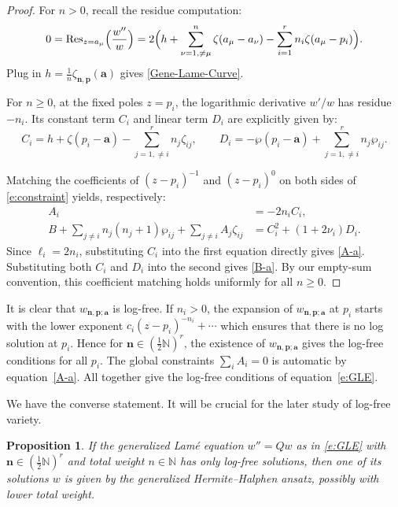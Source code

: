 \documentclass[11pt]{amsart}
\newtheorem{proposition}[theorem]{Proposition}
\theoremstyle{remark}
\numberwithin{equation}{section}
\begin{document}
\begin{proof}
For $n>0$, recall the residue computation:
\[
    0 = {\rm Res}_{z=a_\mu} \Big(\frac{w''}{w} \Big) = 2 \Big( h + \sum_{\nu = 1, \neq \mu}^n \zeta(a_\mu - a_\nu) - \sum_{i = 1}^{r} n_i \zeta(a_\mu - p_i) \Big).
\]
Plug in $h = \frac{1}{n}\zeta_{\mathbf{n},\mathbf{p}}(\mathbf{a})$ gives \eqref{Gene-Lame-Curve}.

For $n\geq 0$, at the fixed poles $z=p_i$, the logarithmic derivative $w'/w$ has residue $ -n_i$. Its constant term $C_i$ and linear term $D_i$ are explicitly given by:
\[
    C_i = h + \zeta(p_i - \mathbf{a}) - \sum_{j=1, \neq i}^r n_j \zeta_{ij}, \qquad
    D_i = -\wp(p_i - \mathbf{a}) + \sum_{j=1, \neq i}^r n_j \wp_{ij}.
\]

Matching the coefficients of $(z-p_i)^{-1}$ and $(z-p_i)^0$ on both sides of \eqref{e:constraint} yields, respectively:
\[
\begin{split}
    A_i &=- 2n_i C_i, \\
    B + \sum_{j\neq i} n_j(n_j + 1)\wp_{ij} + \sum_{j\neq i} A_j \zeta_{ij} &= C_i^2 + (1+2\nu_i) D_i.
\end{split}
\]
Since $\ell_i = 2n_i$, substituting $C_i$ into the first equation directly gives \eqref{A-a}. Substituting both $C_i$ and $D_i$ into the second gives \eqref{B-a}. By our empty-sum convention, this coefficient matching holds uniformly for all $n \ge 0$.
\end{proof}




It is clear that $w_{\mathbf{n}, \mathbf{p}; \mathbf{a}}$ is log-free. If $n_i>0$, the expansion of $w_{\mathbf{n}, \mathbf{p}; \mathbf{a}}$ at $p_i$ starts with the lower exponent $c_i (z-p_i)^{-n_i} + \cdots$  which ensures that there is no log solution at $p_i$. Hence for $\mathbf{n} \in (\tfrac{1}{2}\mathbb{N})^r$, the existence of $w_{\mathbf{n}, \mathbf{p}; \mathbf{a}}$ gives the log-free conditions for all $p_i$. The global constraints $\sum_i A_i=0$ is automatic by equation~\eqref{A-a}. All together give the log-free conditions of equation~\eqref{e:GLE}.

We have the converse statement. It will be crucial for the later study of log-free variety. 

\begin{proposition} \label{exist_ansatz_sol}
If the generalized Lam\'e equation $w'' = Qw$ as in \eqref{e:GLE} with $\mathbf{n} \in (\tfrac{1}{2} \mathbb{N})^r$ and total weight $n \in \mathbb{N}$ has only log-free solutions, then one of its solutions $w$ is given by the generalized Hermite--Halphen ansatz, possibly with lower total weight.
\end{proposition}
\end{document}

